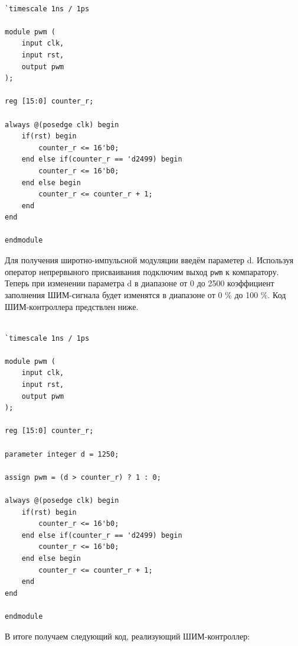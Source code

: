\documentclass[a4paper,oneside ,14pt]{extreport}
\begin{document}
\begin{Verbatim}[tabsize=4]

`timescale 1ns / 1ps

module pwm (
    input clk,
    input rst,
    output pwm
);

reg [15:0] counter_r;

always @(posedge clk) begin 
    if(rst) begin
        counter_r <= 16'b0;
    end else if(counter_r == 'd2499) begin
        counter_r <= 16'b0;
    end else begin
        counter_r <= counter_r + 1;
    end
end

endmodule 

\end{Verbatim}

Для получения широтно-импульсной модуляции введём параметер d. Используя оператор непрервыного присваивания подключим выход \verb|pwm| к компаратору. Теперь при изменении параметра d в диапазоне от 0 до 2500 коэффициент заполнения ШИМ-сигнала будет изменятся в диапазоне от 0 \% до 100 \%. Код ШИМ-контроллера предствлен ниже.

\begin{Verbatim}[tabsize=4]

`timescale 1ns / 1ps

module pwm (
    input clk,
    input rst,
    output pwm
);

reg [15:0] counter_r;

parameter integer d = 1250; 

assign pwm = (d > counter_r) ? 1 : 0; 

always @(posedge clk) begin 
    if(rst) begin
        counter_r <= 16'b0;
    end else if(counter_r == 'd2499) begin
        counter_r <= 16'b0;
    end else begin
        counter_r <= counter_r + 1;
    end
end

endmodule 

\end{Verbatim}

В итоге получаем следующий код, реализующий ШИМ-контроллер:
\end{document}
